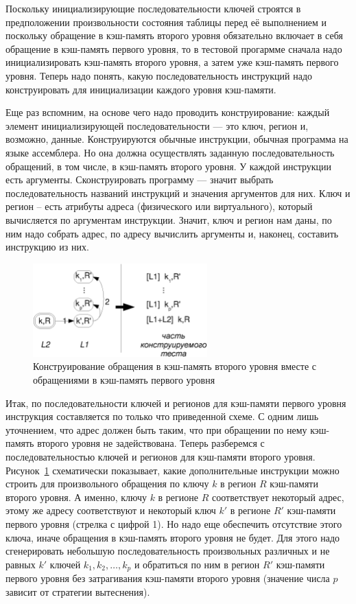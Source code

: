 \documentclass[14pt]{extreport}
\begin{document}
Поскольку инициализирующие последовательности ключей строятся в предположении
произвольности состояния таблицы перед её выполнением и поскольку обращение в
кэш-память второго уровня обязательно включает в себя обращение в кэш-память
первого уровня, то в тестовой прогармме сначала надо инициализировать кэш-память
второго уровня, а затем уже кэш-память первого уровня. Теперь надо понять, какую
последовательность инструкций надо конструировать для инициализации каждого
уровня кэш-памяти.

Еще раз вспомним, на основе чего надо проводить конструирование: каждый элемент
инициализирующей последовательности --- это ключ, регион и, возможно, данные.
Конструируются обычные инструкции, обычная программа на языке ассемблера. Но она
должна осуществлять заданную последовательность обращений, в том числе, в
кэш-память второго уровня. У каждой инструкции есть аргументы. Сконструировать
программу --- значит выбрать последовательность названий инструкций и значения
аргументов для них. Ключ и регион -- есть атрибуты адреса (физического или
виртуального), который вычисляется по аргументам инструкции. Значит, ключ и
регион нам даны, по ним надо собрать адрес, по адресу вычислить аргументы и,
наконец, составить инструкцию из них.

\begin{figure}[h] \centering
\includegraphics[width=0.6\textwidth]{2.theor/L1L2}
\caption{Конструирование обращения в кэш-память второго уровня вместе с
обращениями в кэш-память первого уровня}\label{fig:L1L2}
\end{figure}

Итак, по последовательности ключей и регионов для кэш-памяти первого уровня
инструкция составляется по только что приведенной схеме. С одним лишь
уточнением, что адрес должен быть таким, что при обращении по нему кэш-память
второго уровня не задействована. Теперь разберемся с последовательностью ключей
и регионов для кэш-памяти второго уровня. Рисунок~\ref{fig:L1L2} схематически
показывает, какие дополнительные инструкции можно строить для произвольного
обращения по ключу $k$ в регион $R$ кэш-памяти второго уровня. А именно, ключу
$k$ в регионе $R$ соответствует некоторый адрес, этому же адресу соответствуют и
некоторый ключ $k'$ в регионе $R'$ кэш-памяти первого уровня (стрелка с цифрой
1). Но надо еще обеспечить отсутствие этого ключа, иначе обращения в кэш-память
второго уровня не будет. Для этого надо сгенерировать небольшую
последовательность произвольных различных и не равных $k'$ ключей $k_1, k_2,
\dots, k_p$ и обратиться по ним в регион $R'$ кэш-памяти первого уровня без
затрагивания кэш-памяти второго уровня (значение числа $p$ зависит от стратегии
вытеснения).
\end{document}
